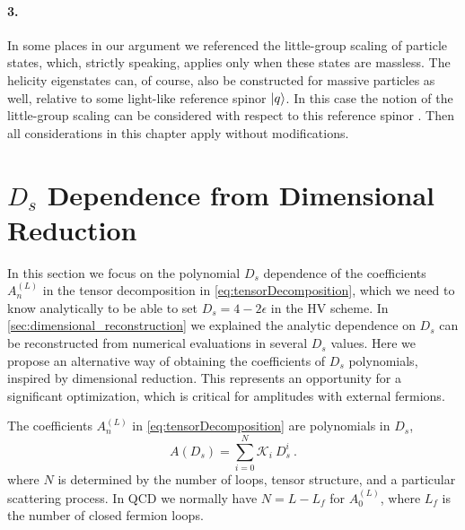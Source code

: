 \paragraph{3.}
In some places in our argument we referenced the little-group scaling 
of particle states, which, strictly speaking, applies only when these states
are massless.
The helicity eigenstates can, of course, also be constructed for
massive particles as well, relative to some light-like reference spinor $\ket{q}$.
In this case the notion of the little-group scaling can be considered with respect
to this reference spinor \cite{Cohen:2010mi}.
Then all considerations in this chapter apply without modifications.

 

\section{\texorpdfstring{$D_s$}{Ds} Dependence from Dimensional Reduction}
\label{sec:ds_reduction}

In this section we focus on the polynomial $D_s$ dependence of 
the coefficients $A^{(L)}_n$ in the tensor decomposition in \cref{eq:tensorDecomposition},
which we need to know analytically to be able to set $D_s=4-2\epsilon$ in the HV scheme.
In \cref{sec:dimensional_reconstruction} we explained the analytic dependence on $D_s$ 
can be reconstructed from numerical evaluations in several $D_s$ values.
Here we propose an alternative way of obtaining the coefficients of $D_s$ polynomials, 
inspired by dimensional reduction.
This represents an opportunity for a significant optimization, 
which is critical for amplitudes with external fermions.

The coefficients $A^{(L)}_n$ in \cref{eq:tensorDecomposition} are polynomials in $D_s$,
\begin{equation}
  A(D_s) = \sum_{i=0}^{N} \mathcal{K}_i~D_s^{i}\ .
  \label{eq:ds-poly}
\end{equation}
where $N$ is determined by the number of loops, tensor structure,
and a particular scattering process. 
In QCD we normally have $N=L - L_f$ for $A^{(L)}_0$, 
where $L_f$ is the number of closed fermion loops.

